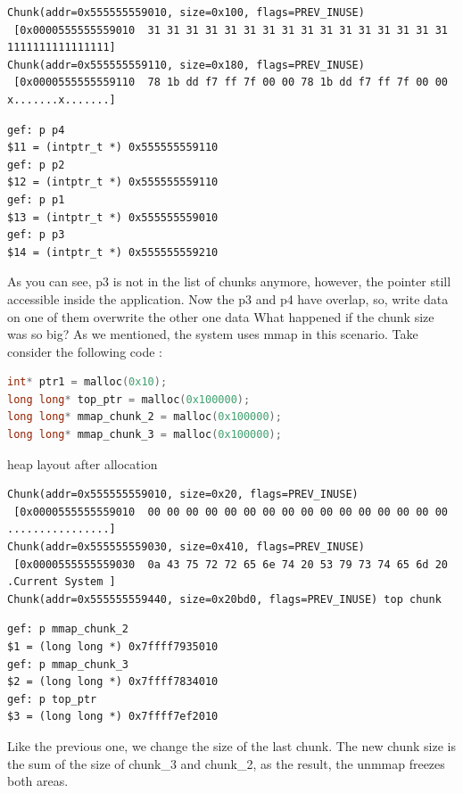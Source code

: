 \documentclass{masterthesis}
\begin{document}
\begin{lstlisting}[frame=tlrb]
Chunk(addr=0x555555559010, size=0x100, flags=PREV_INUSE)
 [0x0000555555559010  31 31 31 31 31 31 31 31 31 31 31 31 31 31 31 31 1111111111111111]
Chunk(addr=0x555555559110, size=0x180, flags=PREV_INUSE)
 [0x0000555555559110  78 1b dd f7 ff 7f 00 00 78 1b dd f7 ff 7f 00 00 x.......x.......]
 \end{lstlisting}

\begin{lstlisting}[frame=tlrb]
gef: p p4
$11 = (intptr_t *) 0x555555559110
gef: p p2
$12 = (intptr_t *) 0x555555559110
gef: p p1
$13 = (intptr_t *) 0x555555559010
gef: p p3
$14 = (intptr_t *) 0x555555559210
 \end{lstlisting}
 
As you can see, p3 is not in the list of chunks anymore, however, the pointer still accessible inside the application. Now the p3 and p4 have overlap, so, write data on one of them overwrite the other one data
What happened if the chunk size was so big? As we mentioned, the system uses mmap in this scenario. Take consider the following code : 

\begin{lstlisting}[language=c,frame=tlrb]
int* ptr1 = malloc(0x10);
long long* top_ptr = malloc(0x100000);
long long* mmap_chunk_2 = malloc(0x100000);
long long* mmap_chunk_3 = malloc(0x100000);
 \end{lstlisting}
 
heap layout after allocation 

\begin{lstlisting}[frame=tlrb]
Chunk(addr=0x555555559010, size=0x20, flags=PREV_INUSE)
 [0x0000555555559010  00 00 00 00 00 00 00 00 00 00 00 00 00 00 00 00 ................]
Chunk(addr=0x555555559030, size=0x410, flags=PREV_INUSE)
 [0x0000555555559030  0a 43 75 72 72 65 6e 74 20 53 79 73 74 65 6d 20 .Current System ]
Chunk(addr=0x555555559440, size=0x20bd0, flags=PREV_INUSE) top chunk
 \end{lstlisting}

\begin{lstlisting}[frame=tlrb]
gef: p mmap_chunk_2
$1 = (long long *) 0x7ffff7935010
gef: p mmap_chunk_3
$2 = (long long *) 0x7ffff7834010
gef: p top_ptr
$3 = (long long *) 0x7ffff7ef2010
 \end{lstlisting}

Like the previous one, we change the size of the last chunk. The new chunk size is the sum of the size of chunk\_3 and chunk\_2, as the result, the unmmap freezes both areas.
\end{document}
